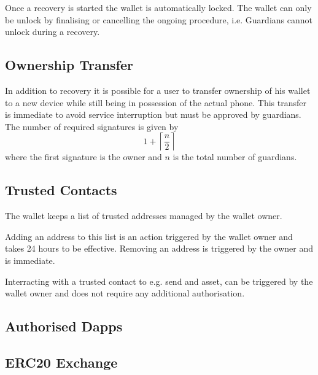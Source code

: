 \documentclass[12pt]{article}
\begin{document}
Once a recovery is started the wallet is automatically locked. The wallet can only be unlock by finalising or cancelling the ongoing procedure, i.e. Guardians cannot unlock during a recovery.

\subsection{Ownership Transfer}

In addition to recovery it is possible for a user to transfer ownership of his wallet to a new device while still being in possession of the actual phone. This transfer is immediate to avoid service interruption but must be approved by guardians. The number of required signatures is given by
\begin{equation*}
    1+\left\lceil {\frac{n}{2}} \right\rceil
\end{equation*}
where the first signature is the owner and $n$ is the total number of guardians.

\subsection{Trusted Contacts}
\label{sec:whitelist}

The wallet keeps a list of trusted addresses managed by the wallet owner.

Adding an address to this list is an action triggered by the wallet owner and takes 24 hours to be effective. Removing an address is triggered by the owner and is immediate.

Interracting with a trusted contact to e.g. send and asset, can be triggered by the wallet owner and does not require any additional authorisation. 

\subsection{Authorised Dapps}



\subsection{ERC20 Exchange}
\end{document}
